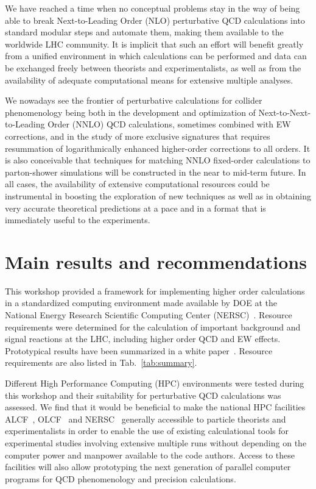 We have reached a time when no conceptual problems stay in
the way of being able to break Next-to-Leading Order (NLO)
perturbative QCD calculations into standard modular steps and automate
them, making them available to the worldwide LHC community.  It is
implicit that such an effort will benefit greatly from a unified
environment in which calculations can be performed and data can be
exchanged freely between theorists and experimentalists,
as well as from the availability of adequate computational means
for extensive multiple analyses.

We nowadays see the frontier of perturbative
calculations for collider phenomenology being both in the
development and optimization of Next-to-Next-to-Leading Order (NNLO)
QCD calculations, sometimes combined with EW corrections, and in the
study of more exclusive signatures that requires resummation 
of logarithmically enhanced higher-order corrections to all orders.
It is also conceivable that techniques for matching NNLO fixed-order 
calculations to parton-shower simulations will be constructed in the 
near to mid-term future. In all cases, the availability 
of extensive computational resources could be instrumental
in boosting the exploration of new techniques as well as in
obtaining very accurate theoretical predictions at a pace and in a
format that is immediately useful to the experiments.

\section{Main results and recommendations}
This workshop provided a framework for implementing higher order  
calculations in a standardized computing environment made available 
by DOE at the National Energy Research Scientific Computing Center
(NERSC)~\cite{NERSC}.  Resource requirements were determined for the
calculation of important background and signal reactions at the
LHC, including higher order QCD and EW effects. Prototypical results 
have been summarized in a white paper~\cite{HPCWP}. Resource
requirements are also listed in Tab.~\ref{tab:summary}.

Different High Performance Computing (HPC) environments were tested
during this workshop and their suitability for perturbative QCD calculations 
was assessed. We find that it would be beneficial to make the national HPC 
facilities ALCF~\cite{ALCF}, OLCF~\cite{OLCF} and NERSC~\cite{NERSC} 
generally accessible to particle theorists and
experimentalists in order to enable the use of existing
calculational tools for experimental studies involving extensive
multiple runs without depending on the computer power and manpower
available to the code authors. Access to these facilities will also
allow prototyping the next generation of parallel computer programs
for QCD phenomenology and precision calculations.

